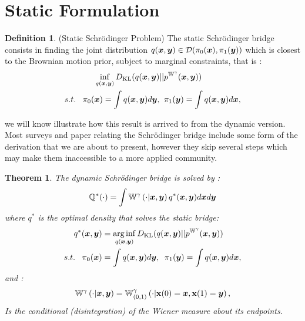 \documentclass[a4paper,12pt,twoside,openright]{report}
\newtheorem{theorem}{Theorem}
\theoremstyle{definition}
\newtheorem{definition}{Definition}[section]
\begin{document}
\section{Static Formulation}
\begin{definition}\label{def:static_bridge}
    (Static Schrödinger Problem) The static Schrödinger bridge consists in finding the joint distribution $q({\bm{x}}, {\bm{y}}) \in {\mathcal{D}}(\pi_0({\bm{x}}), \pi_1({\bm{y}}))$ which is closest to the Brownian motion prior, subject to marginal constraints, that is :
    \begin{align}\label{eq:static_bridge}
        \inf_{q({\bm{x}},{\bm{y}})} D_{\mathrm{KL}} (q({\bm{x}},{\bm{y}})  &|| p^{\mathbb{W}^{\gamma}}({\bm{x}},{\bm{y}})) \nonumber \\
        s.t. \;\;\; \pi_0({\bm{x}}) = \int q({\bm{x}},{\bm{y}}) d{\bm{y}}, &\;\;\pi_1({\bm{y}}) = \int q({\bm{x}},{\bm{y}}) d{\bm{x}},
    \end{align}
\end{definition}
we will know illustrate how this result is arrived to from the dynamic version. Most surveys and paper relating the Schrödinger bridge include some form of the derivation that we are about to present, however they skip several steps which may make them inaccessible to a more applied community. 
\begin{theorem}\citep{follmer1988random}
    The dynamic Schrödinger bridge is solved by :
\begin{align}
    {\mathbb{Q}}^{*} (\cdot) =  \int \mathbb{W}^{\gamma} \left(\cdot | {\bm{x}}, {\bm{y}}\right)  q^{*}({\bm{x}},{\bm{y}}) d{\bm{x}} d{\bm{y}} 
\end{align}
    where $q^*$ is the optimal density that solves the static bridge:
    \begin{align*}
        q^{*}({\bm{x}},{\bm{y}})& = \operatorname*{arg\,inf}_{q({\bm{x}},{\bm{y}})} D_{\mathrm{KL}} (q({\bm{x}},{\bm{y}})  || p^{\mathbb{W}^{\gamma}}({\bm{x}},{\bm{y}}))  \\
        s.t. \;\;\; \pi_0({\bm{x}}) &= \int q({\bm{x}},{\bm{y}}) d{\bm{y}}, \;\;\pi_1({\bm{y}}) = \int q({\bm{x}},{\bm{y}}) d{\bm{x}},
    \end{align*}
    and :
    \begin{align*}
        \mathbb{W}^{\gamma} \left(\cdot | {\bm{x}}, {\bm{y}}\right)  = \mathbb{W}_{(0,1)}^{\gamma}\left(\cdot | {\mathbf{x}}(0) ={\bm{x}}, {\mathbf{x}}(1) ={\bm{y}}\right),
    \end{align*}
    Is the conditional (disintegration) of the Wiener measure about its endpoints.
\end{theorem} %
\end{document}
